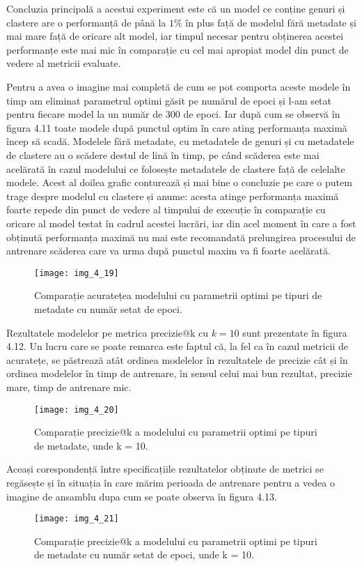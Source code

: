 Concluzia principală a acestui experiment este că un model ce conține genuri și clastere are o performanță de până la $1\%$ în plus față de modelul fără metadate și mai mare față de oricare alt model, iar timpul necesar pentru obținerea acestei performanțe este mai mic în comparație cu cel mai apropiat model din punct de vedere al metricii evaluate.

Pentru a avea o imagine mai completă de cum se pot comporta aceste modele în timp am eliminat parametrul optimi găsit pe numărul de epoci și l-am setat pentru fiecare model la un număr de 300 de epoci. Iar după cum se observă în figura 4.11 toate modele după punctul optim în care ating performanța maximă încep să scadă. Modelele fără metadate, cu metadatele de genuri și cu metadatele de clastere au o scădere destul de lină în timp, pe când scăderea este mai acelărată în cazul modelului ce folosește metadatele de clastere față de celelalte modele. 
Acest al doilea grafic conturează și mai bine o concluzie pe care o putem trage despre modelul cu clastere și anume: acesta atinge performanța maximă foarte repede din punct de vedere al timpului de execuție în comparație cu oricare al model testat în cadrul acestei lucrări, iar din acel moment în care a fost obținută performanța maximă nu mai este recomandată prelungirea procesului de antrenare scăderea care va urma după punctul maxim va fi foarte acelărată.
\begin{figure}[!h]
	\centering
	\texttt{[image: img\_4\_19]}
	\caption[Comparație acuratețea modelului cu parametrii optimi pe tipuri de metadate cu număr setat de epoci]{Comparație acuratețea modelului cu parametrii optimi pe tipuri de metadate cu număr setat de epoci.}
\end{figure}

\vspace{5mm}
Rezultatele modelelor pe metrica precizie@k cu $k=10$ sunt prezentate în figura 4.12. Un lucru care se poate remarca este faptul că, la fel ca în cazul metricii de acuratețe, se păstrează atât ordinea modelelor în rezultatele de precizie cât și în ordinea modelelor în timp de antrenare, în sensul celui mai bun rezultat, precizie mare, timp de antrenare mic.
\begin{figure}[!h]
	\centering
	\texttt{[image: img\_4\_20]}
	\caption[Comparație precizie@k a modelului cu parametrii optimi pe tipuri de metadate]{Comparație precizie@k a modelului cu parametrii optimi pe tipuri de metadate, unde k = 10.}
\end{figure}
Aceași corespondență între specificațiile rezultatelor obținute de metrici se regăsește și în situația în care mărim perioada de antrenare pentru a vedea o imagine de ansamblu dupa cum se poate observa în figura 4.13.
\begin{figure}[!h]
	\centering
	\texttt{[image: img\_4\_21]}
	\caption[Comparație precizie@k a modelului cu parametrii optimi pe tipuri de metadate cu număr setat de epoci]{Comparație precizie@k a modelului cu parametrii optimi pe tipuri de metadate cu număr setat de epoci, unde k = 10.}
\end{figure}


